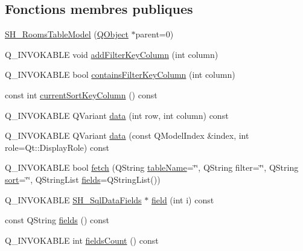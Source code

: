 \subsection*{Fonctions membres publiques}
\begin{DoxyCompactItemize}
\item 
\hyperlink{classSH__RoomsTableModel_a722f2c372e27e502e73f045b38301368}{S\-H\-\_\-\-Rooms\-Table\-Model} (\hyperlink{classQObject}{Q\-Object} $\ast$parent=0)
\item 
Q\-\_\-\-I\-N\-V\-O\-K\-A\-B\-L\-E void \hyperlink{classSH__ExtendedProxyModel_a4e98e24b6b94adf31a2c5e935a48f831}{add\-Filter\-Key\-Column} (int column)
\item 
Q\-\_\-\-I\-N\-V\-O\-K\-A\-B\-L\-E bool \hyperlink{classSH__ExtendedProxyModel_a865da9bd795526dc63b8c6447d59cfc0}{contains\-Filter\-Key\-Column} (int column)
\item 
const int \hyperlink{classSH__ExtendedProxyModel_a76786ad4b81dbd521a610c2f6f973a96}{current\-Sort\-Key\-Column} () const 
\item 
Q\-\_\-\-I\-N\-V\-O\-K\-A\-B\-L\-E Q\-Variant \hyperlink{classSH__ExtendedProxyModel_aca6cc510f740e847e0cfc06e0adb5771}{data} (int row, int column) const 
\item 
Q\-\_\-\-I\-N\-V\-O\-K\-A\-B\-L\-E Q\-Variant \hyperlink{classSH__ExtendedProxyModel_afbc947efbe1107fc5bf8926c52902a1c}{data} (const Q\-Model\-Index \&index, int role=Qt\-::\-Display\-Role) const 
\item 
Q\-\_\-\-I\-N\-V\-O\-K\-A\-B\-L\-E bool \hyperlink{classSH__ExtendedProxyModel_a64f684a4a7d35925ff4f4b81984da60e}{fetch} (Q\-String \hyperlink{classSH__ExtendedProxyModel_aba6e6f8bbde17ea533de3e9a127c804a}{table\-Name}=\char`\"{}\char`\"{}, Q\-String filter=\char`\"{}\char`\"{}, Q\-String \hyperlink{classSH__ExtendedProxyModel_a5ed9b14df78667efe8b22d19617d6c4b}{sort}=\char`\"{}\char`\"{}, Q\-String\-List \hyperlink{classSH__ExtendedProxyModel_addbd48beef730fe7adfaffcaca8b256a}{fields}=Q\-String\-List())
\item 
Q\-\_\-\-I\-N\-V\-O\-K\-A\-B\-L\-E \hyperlink{classSH__SqlDataFields}{S\-H\-\_\-\-Sql\-Data\-Fields} $\ast$ \hyperlink{classSH__ExtendedProxyModel_ac73fae31c6ad69663b4df97f65ec945f}{field} (int i) const 
\item 
const Q\-String \hyperlink{classSH__ExtendedProxyModel_addbd48beef730fe7adfaffcaca8b256a}{fields} () const 
\item 
Q\-\_\-\-I\-N\-V\-O\-K\-A\-B\-L\-E int \hyperlink{classSH__ExtendedProxyModel_a5a5e6b84a9a397e096f4404cec5e9e0c}{fields\-Count} () const 

\end{DoxyCompactItemize}
